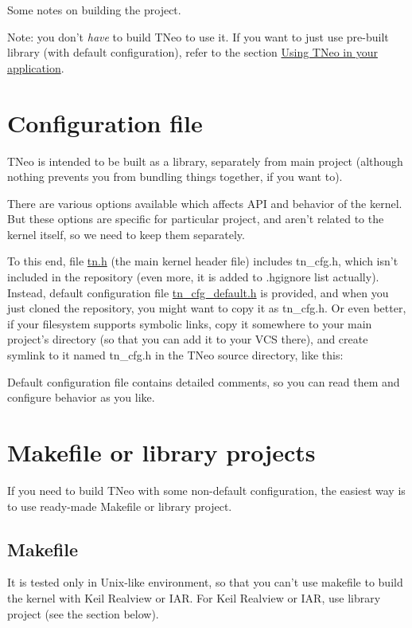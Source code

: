 Some notes on building the project.

Note\+: you don't {\itshape have} to build T\+Neo to use it. If you want to just use pre-\/built library (with default configuration), refer to the section \hyperlink{quick_guide_usage_generic}{Using T\+Neo in your application}.\hypertarget{building_configuration_file}{}\section{Configuration file}\label{building_configuration_file}
T\+Neo is intended to be built as a library, separately from main project (although nothing prevents you from bundling things together, if you want to).

There are various options available which affects A\+P\+I and behavior of the kernel. But these options are specific for particular project, and aren't related to the kernel itself, so we need to keep them separately.

To this end, file {\ttfamily \hyperlink{tn_8h}{tn.\+h}} (the main kernel header file) includes {\ttfamily tn\+\_\+cfg.\+h}, which isn't included in the repository (even more, it is added to {\ttfamily .hgignore} list actually). Instead, default configuration file {\ttfamily \hyperlink{tn__cfg__default_8h}{tn\+\_\+cfg\+\_\+default.\+h}} is provided, and when you just cloned the repository, you might want to copy it as {\ttfamily tn\+\_\+cfg.\+h}. Or even better, if your filesystem supports symbolic links, copy it somewhere to your main project's directory (so that you can add it to your V\+C\+S there), and create symlink to it named {\ttfamily tn\+\_\+cfg.\+h} in the T\+Neo source directory, like this\+: 


Default configuration file contains detailed comments, so you can read them and configure behavior as you like.\hypertarget{building_building_generic__makefile_lib_project}{}\section{Makefile or library projects}\label{building_building_generic__makefile_lib_project}
If you need to build T\+Neo with some non-\/default configuration, the easiest way is to use ready-\/made Makefile or library project.\hypertarget{building_building_generic__makefile}{}\subsection{Makefile}\label{building_building_generic__makefile}
It is tested only in Unix-\/like environment, so that you can't use makefile to build the kernel with Keil Realview or I\+A\+R. For Keil Realview or I\+A\+R, use library project (see the section below).

